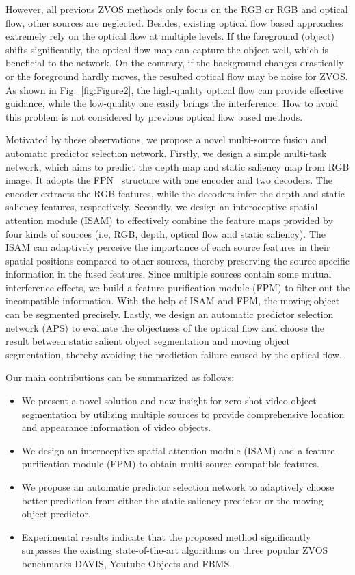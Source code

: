 \documentclass[sigconf]{acmart}
\begin{document}
However, all previous ZVOS methods only focus on the RGB or RGB and optical flow, other sources are neglected. Besides, existing optical flow based approaches extremely rely on the optical flow at multiple levels. If the foreground (object) shifts significantly, the optical flow map can capture the object well, which is beneficial to the network. On the contrary, if the background changes drastically or the foreground hardly moves, the resulted optical flow may be noise for ZVOS. As shown in Fig.~\ref{fig:Figure2}, the high-quality optical flow can provide effective guidance, while the low-quality one easily brings the interference. How to avoid this problem is not considered by previous optical flow based methods.

Motivated by these observations, we propose a novel multi-source fusion and automatic predictor selection network. 
Firstly, we design a simple multi-task network, which aims to predict the depth map and static saliency map from RGB image. It adopts the FPN~\cite{FPN} structure with one encoder and two decoders. The encoder extracts the RGB features, while the decoders infer the depth and static saliency features, respectively.
Secondly, we design an interoceptive spatial attention module (ISAM) to effectively combine the feature maps provided by four kinds of sources (i.e, RGB, depth, optical flow and static saliency). 
The ISAM can adaptively perceive the importance of each source features in their spatial positions compared to other sources, thereby preserving the source-specific information in the fused features. 
Since multiple sources  contain some mutual interference effects, we build a feature purification module (FPM) 
to filter out the incompatible information. With the help of ISAM and FPM, the moving object can be segmented precisely.
Lastly, we design an automatic predictor selection network (APS) to evaluate the objectness of the optical flow and choose the result between static salient object segmentation and moving
object segmentation, thereby avoiding the prediction failure caused by the optical flow.

Our main contributions can be summarized as follows:
\begin{itemize}
     \item  We present a novel solution and new insight for  zero-shot video object segmentation by utilizing multiple sources to provide comprehensive location and appearance information of video objects.
     
    \item  We design an interoceptive spatial attention module (ISAM) and a feature purification module (FPM) to obtain multi-source compatible features.
   
     \item We propose an  automatic predictor selection network to adaptively choose better prediction from either the static saliency predictor or the moving object predictor. 
    
    \item Experimental results indicate that the proposed method significantly surpasses the existing state-of-the-art algorithms on three popular ZVOS benchmarks DAVIS, Youtube-Objects and FBMS.
\end{itemize}
\end{document}
